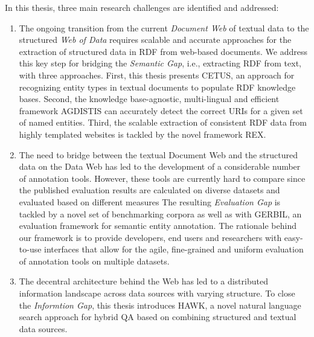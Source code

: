 In this thesis, three main research challenges are identified and addressed:
\begin{enumerate}
\item 
The ongoing transition from the current \emph{Document Web} of textual data to the structured \emph{Web of Data} requires scalable and accurate approaches for the extraction of structured data in \ac{RDF} from web-based documents.
We address this key step for bridging the \emph{Semantic Gap}, i.e., extracting RDF from text, with three approaches.
First, this thesis presents CETUS, an approach for recognizing entity types in textual documents to populate RDF knowledge bases. 
Second, the knowledge base-agnostic, multi-lingual and efficient framework AGDISTIS can accurately detect the correct URIs for a given set of named entities.
Third, the scalable extraction of consistent \ac{RDF} data from highly templated websites is tackled by the novel framework REX.
\item 
The need to bridge between the textual Document Web and the structured data on the Data Web has led to the development of a considerable number of annotation tools. 
However, these tools are currently hard to compare since the published evaluation results are calculated on diverse datasets and evaluated based on different measures
The resulting \emph{Evaluation Gap} is tackled by a novel set of benchmarking corpora as well as with GERBIL, an evaluation framework for semantic entity annotation. 
The rationale behind our framework is to provide developers, end users and researchers with easy-to-use interfaces that allow for the agile, fine-grained and uniform evaluation of annotation tools on multiple datasets.
\item 
The decentral architecture behind the Web has led to a distributed information landscape across data sources with varying structure. 
To close the \emph{Informtion Gap},  this thesis introduces HAWK, a novel natural language search approach for hybrid \ac{QA} based on combining structured and textual data sources.
\end{enumerate}
